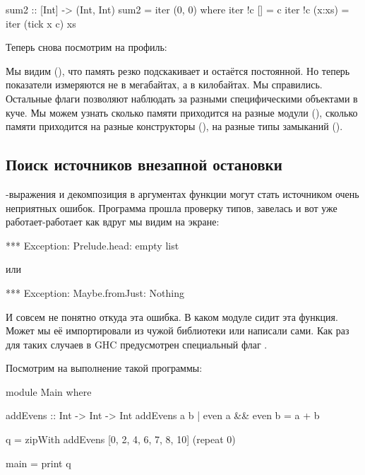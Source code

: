 

\begin{code}
sum2 :: [Int] -> (Int, Int)
sum2 = iter (0, 0)
    where iter !c  []     = c
          iter !c  (x:xs) = iter (tick x c) xs
\end{code}

Теперь снова посмотрим на профиль:

  

Мы видим (), что память резко подскакивает
и остаётся постоянной. Но теперь показатели измеряются не в мегабайтах,
а в килобайтах. Мы справились. Остальные флаги 
позволяют наблюдать за разными специфическими объектами
в куче. Мы можем узнать сколько памяти приходится на
разные модули (), сколько памяти приходится на 
разные конструкторы (), на разные типы замыканий ().






\subsection{Поиск источников внезапной остановки}

-выражения и декомпозиция в аргументах функции
могут стать источником очень неприятных ошибок. Программа
прошла проверку типов, завелась и вот уже работает-работает
как вдруг мы видим на экране:

\begin{code}
*** Exception: Prelude.head: empty list
\end{code}

или 

\begin{code}
*** Exception: Maybe.fromJust: Nothing
\end{code}

И совсем не понятно откуда эта ошибка. В каком модуле
сидит эта функция. Может мы её импортировали из чужой библиотеки
или написали сами. Как раз для таких случаев в GHC предусмотрен
специальный флаг . 

Посмотрим на выполнение такой программы:

\begin{code}
module Main where

addEvens :: Int -> Int -> Int
addEvens a b 
    | even a && even b = a + b

q = zipWith addEvens [0, 2, 4, 6, 7, 8, 10] (repeat 0)

main = print q
\end{code}
  
